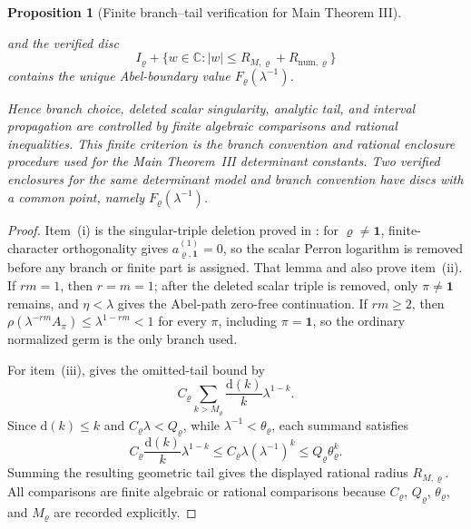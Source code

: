 \documentclass[11pt,a4paper]{amsart}
\theoremstyle{plain}
\newtheorem{proposition}[theorem]{Proposition}
\theoremstyle{definition}
\theoremstyle{remark}
\newcommand{\CC}{\mathbb{C}}
\begin{document}
\begin{proposition}[Finite branch--tail verification for Main Theorem III]
\begin{enumerate}[label=\textup{(\roman*)},leftmargin=*]
      and the verified disc
      \[
        I_\varrho+
        \{w\in\CC:|w|\le R_{M,\varrho}+R_{\mathrm{num},\varrho}\}
      \]
      contains the unique Abel-boundary value \(F_\varrho(\lambda^{-1})\).
  \end{enumerate}
  Hence branch choice, deleted scalar singularity, analytic tail, and interval
  propagation are controlled by finite algebraic comparisons and rational
  inequalities.  This finite criterion is the branch convention and rational
  enclosure procedure used for the Main Theorem~III determinant constants.  Two
  verified enclosures for the same determinant model and branch convention have
  discs with a common point, namely
  \(F_\varrho(\lambda^{-1})\).
\end{proposition}

\begin{proof}
  Item~\textup{(i)} is the singular-triple deletion proved in
  : for
  \(\varrho\ne\mathbf1\), finite-character orthogonality gives
  \(a_{\varrho,\mathbf1}^{(1)}=0\), so the scalar Perron logarithm is removed
  before any branch or finite part is assigned.  That lemma and
   also prove item~\textup{(ii)}.
  If \(rm=1\), then \(r=m=1\); after the deleted scalar triple is removed,
  only \(\pi\ne\mathbf1\) remains, and \(\eta<\lambda\) gives the Abel-path
  zero-free continuation.  If \(rm\ge2\), then
  \(\rho(\lambda^{-rm}A_\pi)\le\lambda^{1-rm}<1\) for every \(\pi\), including
  \(\pi=\mathbf1\), so the ordinary normalized germ is the only branch used.

  For item~\textup{(iii)},
   gives the omitted-tail bound
  by
  \[
    C_\varrho
    \sum_{k>M_\varrho}\frac{\mathrm d(k)}{k}\lambda^{1-k}.
  \]
  Since \(\mathrm d(k)\le k\) and
  \(C_\varrho\lambda<Q_\varrho\), while
  \(\lambda^{-1}<\theta_\varrho\), each summand satisfies
  \[
    C_\varrho\frac{\mathrm d(k)}{k}\lambda^{1-k}
    \le C_\varrho\lambda(\lambda^{-1})^k
    \le Q_\varrho\theta_\varrho^k .
  \]
  Summing the resulting geometric tail gives the displayed rational radius
  \(R_{M,\varrho}\).  All comparisons are finite algebraic or rational
  comparisons because \(C_\varrho\), \(Q_\varrho\), \(\theta_\varrho\), and
  \(M_\varrho\) are recorded explicitly.


\end{proof}
\end{document}

